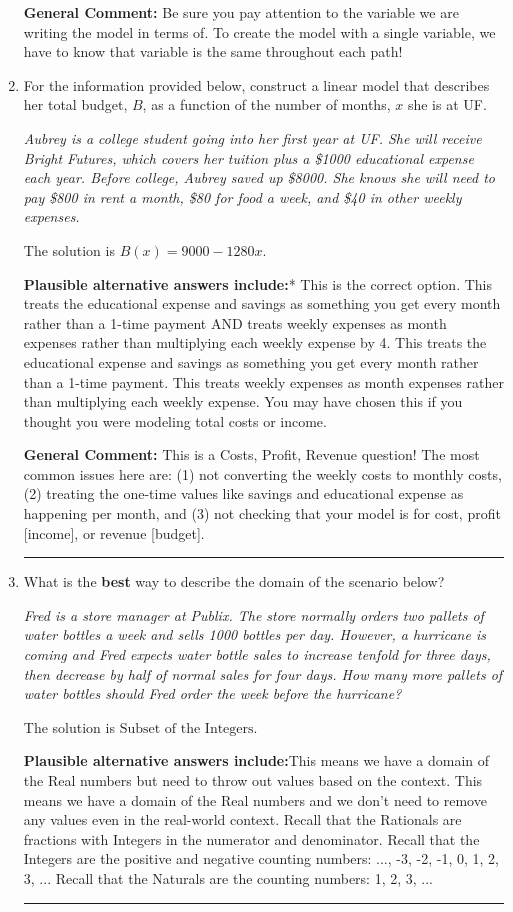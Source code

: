 \documentclass{extbook}[14pt]
\newcommand{\litem}[1]{\item #1

\rule{\textwidth}{0.4pt}}
\begin{document}
\begin{enumerate}
{\textbf{General Comment:} Be sure you pay attention to the variable we are writing the model in terms of. To create the model with a single variable, we have to know that variable is the same throughout each path!
}
\litem{
For the information provided below, construct a linear model that describes her total budget, $B$, as a function of the number of months, $x$ she is at UF.

\begin{center}
    \textit{ Aubrey is a college student going into her first year at UF. She will receive Bright Futures, which covers her tuition plus a \$1000 educational expense each year. Before college, Aubrey saved up \$8000. She knows she will need to pay \$800 in rent a month, \$80 for food a week, and \$40 in other weekly expenses. }
\end{center}
The solution is \( B(x) = 9000 - 1280 x \).\begin{enumerate}[label=\Alph*.]
\textbf{Plausible alternative answers include:}* This is the correct option.
This treats the educational expense and savings as something you get every month rather than a 1-time payment AND treats weekly expenses as month expenses rather than multiplying each weekly expense by 4.
This treats the educational expense and savings as something you get every month rather than a 1-time payment.
This treats weekly expenses as month expenses rather than multiplying each weekly expense.
You may have chosen this if you thought you were modeling total costs or income.
\end{enumerate}

\textbf{General Comment:} This is a Costs, Profit, Revenue question! The most common issues here are: (1) not converting the weekly costs to monthly costs, (2) treating the one-time values like savings and educational expense as happening per month, and (3) not checking that your model is for cost, profit [income], or revenue [budget].
}
\litem{
What is the \textbf{best} way to describe the domain of the scenario below?

\begin{center}
    \textit{ Fred is a store manager at Publix. The store normally orders two pallets of water bottles a week and sells 1000 bottles per day. However, a hurricane is coming and Fred expects water bottle sales to increase tenfold for three days, then decrease by half of normal sales for four days. How many more pallets of water bottles should Fred order the week before the hurricane? }
\end{center}
The solution is \( \text{Subset of the Integers} \).\begin{enumerate}[label=\Alph*.]
\textbf{Plausible alternative answers include:}This means we have a domain of the Real numbers but need to throw out values based on the context.
This means we have a domain of the Real numbers and we don't need to remove any values even in the real-world context.
Recall that the Rationals are fractions with Integers in the numerator and denominator.
Recall that the Integers are the positive and negative counting numbers: ..., -3, -2, -1, 0, 1, 2, 3, ... 
Recall that the Naturals are the counting numbers: 1, 2, 3, ...
\end{enumerate}

}
\end{enumerate}
\end{document}
